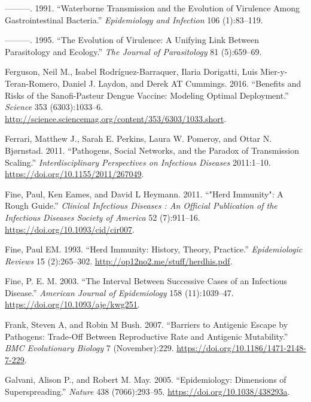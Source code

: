 \documentclass[]{book}
\theoremstyle{definition}
\theoremstyle{definition}
\theoremstyle{definition}
\theoremstyle{remark}
\begin{document}
\leavevmode\hypertarget{ref-ewald91}{}%
---------. 1991. ``Waterborne Transmission and the Evolution of
Virulence Among Gastrointestinal Bacteria.'' \emph{Epidemiology and
Infection} 106 (1):83--119.

\leavevmode\hypertarget{ref-ewald95}{}%
---------. 1995. ``The Evolution of Virulence: A Unifying Link Between
Parasitology and Ecology.'' \emph{The Journal of Parasitology} 81
(5):659--69.

\leavevmode\hypertarget{ref-ferguson16}{}%
Ferguson, Neil M., Isabel Rodríguez-Barraquer, Ilaria Dorigatti, Luis
Mier-y-Teran-Romero, Daniel J. Laydon, and Derek AT Cummings. 2016.
``Benefits and Risks of the Sanofi-Pasteur Dengue Vaccine: Modeling
Optimal Deployment.'' \emph{Science} 353 (6303):1033--6.
\url{http://science.sciencemag.org/content/353/6303/1033.short}.

\leavevmode\hypertarget{ref-ferrari11}{}%
Ferrari, Matthew J., Sarah E. Perkins, Laura W. Pomeroy, and Ottar N.
Bjørnstad. 2011. ``Pathogens, Social Networks, and the Paradox of
Transmission Scaling.'' \emph{Interdisciplinary Perspectives on
Infectious Diseases} 2011:1--10.
\url{https://doi.org/10.1155/2011/267049}.

\leavevmode\hypertarget{ref-fine11}{}%
Fine, Paul, Ken Eames, and David L Heymann. 2011. ``"Herd Immunity": A
Rough Guide.'' \emph{Clinical Infectious Diseases : An Official
Publication of the Infectious Diseases Society of America} 52
(7):911--16. \url{https://doi.org/10.1093/cid/cir007}.

\leavevmode\hypertarget{ref-fine93}{}%
Fine, Paul EM. 1993. ``Herd Immunity: History, Theory, Practice.''
\emph{Epidemiologic Reviews} 15 (2):265--302.
\url{http://op12no2.me/stuff/herdhis.pdf}.

\leavevmode\hypertarget{ref-fine03}{}%
Fine, P. E. M. 2003. ``The Interval Between Successive Cases of an
Infectious Disease.'' \emph{American Journal of Epidemiology} 158
(11):1039--47. \url{https://doi.org/10.1093/aje/kwg251}.

\leavevmode\hypertarget{ref-frank07}{}%
Frank, Steven A, and Robin M Bush. 2007. ``Barriers to Antigenic Escape
by Pathogens: Trade-Off Between Reproductive Rate and Antigenic
Mutability.'' \emph{BMC Evolutionary Biology} 7 (November):229.
\url{https://doi.org/10.1186/1471-2148-7-229}.

\leavevmode\hypertarget{ref-galvani05}{}%
Galvani, Alison P., and Robert M. May. 2005. ``Epidemiology: Dimensions
of Superspreading.'' \emph{Nature} 438 (7066):293--95.
\url{https://doi.org/10.1038/438293a}.
\end{document}
